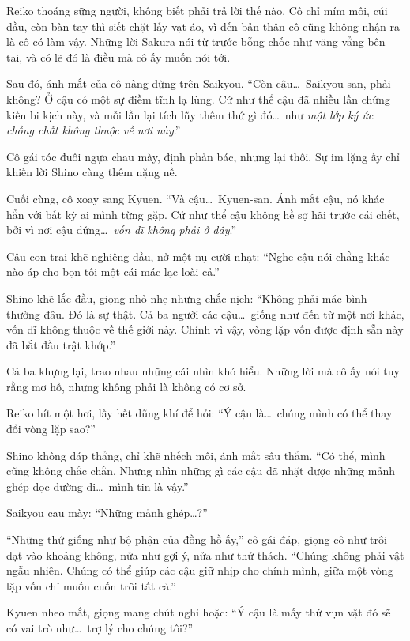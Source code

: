 \documentclass[../main.tex]{subfiles}
\begin{document}
Reiko thoáng sững người, không biết phải trả lời thế nào. Cô chỉ mím môi, cúi đầu, còn bàn tay thì siết chặt lấy vạt áo, vì đến bản thân cô cũng không nhận ra là cô có làm vậy. Những lời Sakura nói từ trước bỗng chốc như văng vẳng bên tai, và có lẽ đó là điều mà cô ấy muốn nói tới.

Sau đó, ánh mắt của cô nàng dừng trên Saikyou. ``Còn cậu\dots\ Saikyou-san, phải không? Ở cậu có một sự điềm tĩnh lạ lùng. Cứ như thể cậu đã nhiều lần chứng kiến bi kịch này, và mỗi lần lại tích lũy thêm thứ gì đó\dots\ như \emph{một lớp ký ức chồng chất không thuộc về nơi này}.''

Cô gái tóc đuôi ngựa chau mày, định phản bác, nhưng lại thôi. Sự im lặng ấy chỉ khiến lời Shino càng thêm nặng nề.

Cuối cùng, cô xoay sang Kyuen. ``Và cậu\dots\ Kyuen-san. Ánh mắt cậu, nó khác hẳn với bất kỳ ai mình từng gặp. Cứ như thể cậu không hề sợ hãi trước cái chết, bởi vì nơi cậu đứng\dots\ \emph{vốn dĩ không phải ở đây}.''

Cậu con trai khẽ nghiêng đầu, nở một nụ cười nhạt: ``Nghe cậu nói chằng khác nào áp cho bọn tôi một cái mác lạc loài cả.''

Shino khẽ lắc đầu, giọng nhỏ nhẹ nhưng chắc nịch: ``Không phải mác bình thường đâu. Đó là sự thật. Cả ba người các cậu\dots\ giống như đến từ một nơi khác, vốn dĩ không thuộc về thế giới này. Chính vì vậy, vòng lặp vốn được định sẵn này đã bắt đầu trật khớp.''

Cả ba khựng lại, trao nhau những cái nhìn khó hiểu. Những lời mà cô ấy nói tuy rằng mơ hồ, nhưng không phải là không có cơ sở.

Reiko hít một hơi, lấy hết dũng khí để hỏi: ``Ý cậu là\dots\ chúng mình có thể thay đổi vòng lặp sao?''

Shino không đáp thẳng, chỉ khẽ nhếch môi, ánh mắt sâu thẳm. ``Có thể, mình cũng không chắc chắn. Nhưng nhìn những gì các cậu đã nhặt được những mảnh ghép dọc đường đi\dots\ mình tin là vậy.''

Saikyou cau mày: ``Những mảnh ghép\dots?''

``Những thứ giống như bộ phận của đồng hồ ấy,'' cô gái đáp, giọng cô như trôi dạt vào khoảng không, nửa như gợi ý, nửa như thử thách. ``Chúng không phải vật ngẫu nhiên. Chúng có thể giúp các cậu giữ nhịp cho chính mình, giữa một vòng lặp vốn chỉ muốn cuốn trôi tất cả.''

Kyuen nheo mắt, giọng mang chút nghi hoặc: ``Ý cậu là mấy thứ vụn vặt đó sẽ có vai trò như\dots\ trợ lý cho chúng tôi?''
\end{document}

